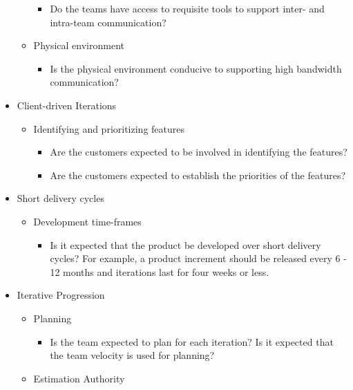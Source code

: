 \begin{itemize}
\begin{itemize}
\begin{itemize}
					\item Do the teams have access to requisite tools to support inter- and intra-team communication?
				\end{itemize}
			\item Physical environment
				\begin{itemize}
					\item Is the physical environment conducive to supporting high bandwidth communication?
				\end{itemize}
		\end{itemize}
	\item Client-driven Iterations
		\begin{itemize}
			\item Identifying and prioritizing features
				\begin{itemize}
					\item Are the customers expected to be involved in identifying the features?
					\item Are the customers expected to establish the priorities of the features?
				\end{itemize}
		\end{itemize}
	\item Short delivery cycles
		\begin{itemize}
			\item Development time-frames
				\begin{itemize}
					\item Is it expected that the product be developed over short delivery cycles? For example, a product increment should be released every 6 - 12 months and iterations last for four weeks or less.
				\end{itemize}
		\end{itemize}
	\item Iterative Progression
		\begin{itemize}
			\item Planning
				\begin{itemize}
					\item Is the team expected to plan for each iteration?
					\addition Is it expected that the team velocity is used for planning?
				\end{itemize}
			\item Estimation Authority

\end{itemize}
\end{itemize}
